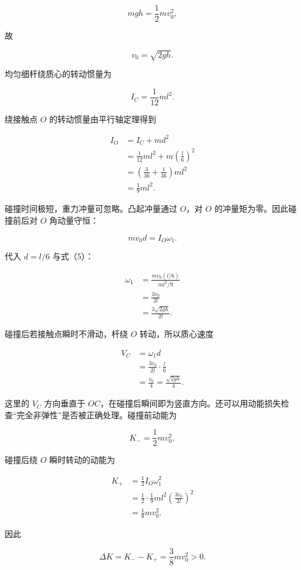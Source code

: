 \documentclass[12pt,a4paper,UTF8]{ctexart}
\begin{document}
\[
mgh=\frac12mv_0^2,
\tag{2}
\]

故

\[
v_0=\sqrt{2gh}.
\tag{3}
\]

均匀细杆绕质心的转动惯量为

\[
I_C=\frac1{12}ml^2.
\tag{4}
\]

绕接触点 \(O\) 的转动惯量由平行轴定理得到

\[
\begin{aligned}
I_O
&=I_C+md^2\\
&=\frac1{12}ml^2+m\left(\frac l6\right)^2\\
&=\left(\frac3{36}+\frac1{36}\right)ml^2\\
&=\frac19ml^2.
\end{aligned}
\tag{5}
\]

碰撞时间极短，重力冲量可忽略。凸起冲量通过 \(O\)，对 \(O\)
的冲量矩为零。因此碰撞前后对 \(O\) 角动量守恒：

\[
mv_0d=I_O\omega_1.
\tag{6}
\]

代入 \(d=l/6\) 与式（5）：

\[
\begin{aligned}
\omega_1
&=\frac{mv_0(l/6)}{ml^2/9}\\
&=\frac{3v_0}{2l}\\
&=\boxed{\frac{3\sqrt{2gh}}{2l}}.
\end{aligned}
\tag{7}
\]

碰撞后若接触点瞬时不滑动，杆绕 \(O\) 转动，所以质心速度

\[
\begin{aligned}
V_C
&=\omega_1d\\
&=\frac{3v_0}{2l}\cdot\frac l6\\
&=\boxed{\frac{v_0}{4}=\frac{\sqrt{2gh}}4}.
\end{aligned}
\tag{8}
\]

这里的 \(V_C\) 方向垂直于
\(OC\)，在碰撞后瞬间即为竖直方向。还可以用动能损失检查``完全非弹性''是否被正确处理。碰撞前动能为

\[
K_-=\frac12mv_0^2,
\]

碰撞后绕 \(O\) 瞬时转动的动能为

\[
\begin{aligned}
K_+
&=\frac12I_O\omega_1^2\\
&=\frac12\cdot\frac19ml^2
\left(\frac{3v_0}{2l}\right)^2\\
&=\frac18mv_0^2.
\end{aligned}
\]

因此

\[
\Delta K=K_--K_+=\frac38mv_0^2>0.
\]
\end{document}
